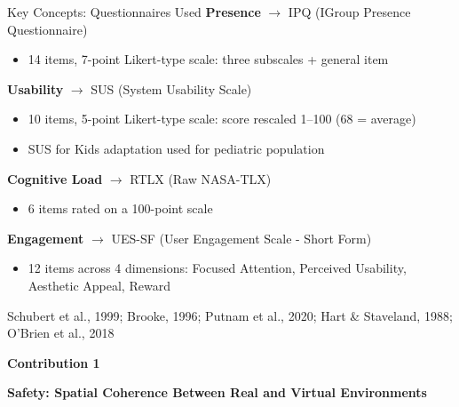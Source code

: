 \documentclass[aspectratio=169, 12pt]{beamer}
\newcommand{\citefooter}[1]{\hfill{\tiny #1}}
\begin{document}
\begin{frame}{Key Concepts: Questionnaires Used}
	\textbf{\textcolor{gbAqua}{Presence}} $\rightarrow$ IPQ (IGroup Presence Questionnaire)
	\begin{itemize}
		\item 14 items, 7-point Likert-type scale: three subscales + general item
	\end{itemize}

	\vspace{0.2cm}
	\textbf{\textcolor{gbAqua}{Usability}} $\rightarrow$ SUS (System Usability Scale)
	\begin{itemize}
		\item 10 items, 5-point Likert-type scale: score rescaled 1--100 (68 = average)
		\item SUS for Kids adaptation used for pediatric population
	\end{itemize}

	\vspace{0.2cm}
	\textbf{\textcolor{gbAqua}{Cognitive Load}} $\rightarrow$ RTLX (Raw NASA-TLX)
	\begin{itemize}
		\item 6 items rated on a 100-point scale
	\end{itemize}

	\vspace{0.2cm}
	\textbf{\textcolor{gbAqua}{Engagement}} $\rightarrow$ UES-SF (User Engagement Scale - Short Form)
	\begin{itemize}
		\item 12 items across 4 dimensions: Focused Attention, Perceived Usability, Aesthetic Appeal, Reward
	\end{itemize}

	\citefooter{Schubert et al., 1999; Brooke, 1996; Putnam et al., 2020; Hart \& Staveland, 1988; O'Brien et al., 2018}
\end{frame}



\begin{frame}[plain]
	\vfill
	\begin{center}
		{\large \textcolor{gbAqua}{\textbf{Contribution 1}}}
		
		\vspace{0.4cm}
		
		{\LARGE \textbf{Safety: Spatial Coherence Between Real and Virtual Environments}}
		
		\vspace{0.4cm}
	\end{center}
	\vfill
\end{frame}
\end{document}
